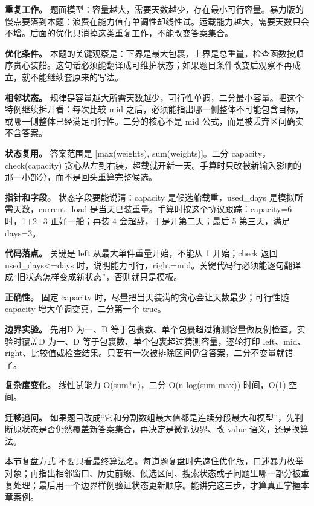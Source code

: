\textbf{重复工作。} 题面模型：容量越大，需要天数越少，存在最小可行容量。暴力版的慢点要落到本题：浪费在能力值有单调性却线性试。运载能力越大，需要天数只会不增。后面的优化只消掉这类重复工作，不能改变答案集合。

\textbf{优化条件。} 本题的关键观察是：下界是最大包裹，上界是总重量，检查函数按顺序贪心装船。这句话必须能翻译成可维护状态；如果题目条件改变后观察不再成立，就不能继续套原来的写法。

\textbf{相邻状态。} 规律是容量越大所需天数越少，可行性单调，二分最小容量。把这个特例继续拆开看：每次比较 mid 之后，必须能指出哪一侧整体不可能包含目标，或哪一侧整体已经满足可行性。二分的核心不是 mid 公式，而是被丢弃区间确实不含答案。

\textbf{状态复用。} 答案范围是 [max(weights), sum(weights)]。二分 capacity，check(capacity) 贪心从左到右装，超载就开新一天。手算时只改被新输入影响的那一小部分，而不是回头重算完整候选。

\textbf{指针和字段。} 状态字段要能说清：capacity 是候选船载重，used\_days 是模拟所需天数，current\_load 是当天已装重量。手算时按这个协议跟踪：capacity=6 时，1+2+3 正好一船；再装 4 会超载，于是开第二天；最后 5 第三天，满足 days=3。

\textbf{代码落点。} 关键是 left 从最大单件重量开始，不能从 1 开始；check 返回 used\_days<=days 时，说明能力可行，right=mid。关键代码行必须能逐句翻译成“旧状态怎样变成新状态”，否则就只是模板。

\textbf{正确性。} 固定 capacity 时，尽量把当天装满的贪心会让天数最少；可行性随 capacity 增大单调变真，二分第一个 true。

\textbf{边界实验。} 先用D 为一、D 等于包裹数、单个包裹超过猜测容量做反例检查。实验时覆盖D 为一、D 等于包裹数、单个包裹超过猜测容量，逐轮打印 left、mid、right、比较值或检查结果。只要有一次被排除区间仍含答案，二分不变量就错了。

\textbf{复杂度变化。} 线性试能力 O(sum*n)，二分 O(n log(sum-max)) 时间，O(1) 空间。

\textbf{迁移追问。} 如果题目改成“它和分割数组最大值都是连续分段最大和模型”，先判断原状态是否仍然覆盖新答案集合，再决定是微调边界、改 value 语义，还是换算法。

\begin{principlebox}{本节复盘方式}
不要只看最终算法名。每道题复盘时先遮住优化版，口述暴力枚举对象；再指出相邻窗口、历史前缀、候选区间、搜索状态或子问题里哪一部分被重复处理；最后用一个边界样例验证状态更新顺序。能讲完这三步，才算真正掌握本章案例。
\end{principlebox}
